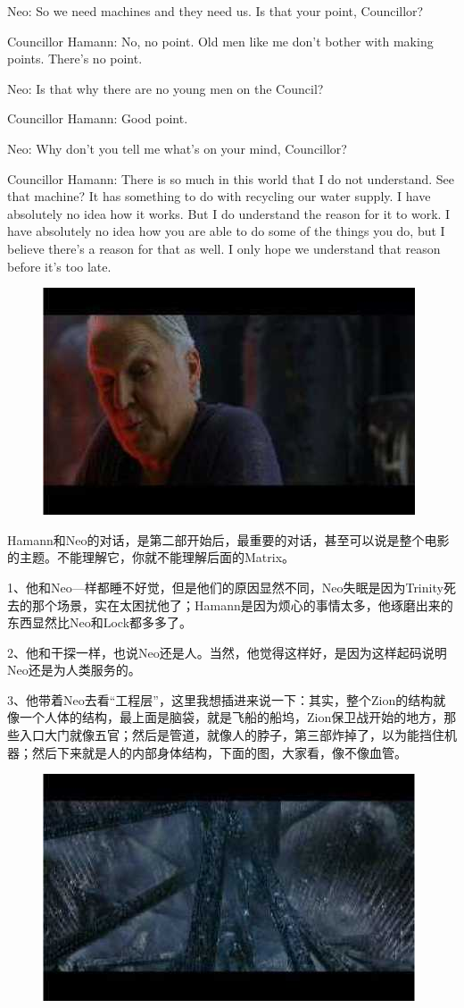 \documentclass{ctexart}
\newenvironment{myquote}{\color{green} \setlength{\leftskip}{6em} \setlength{\rightskip}{4em} \setlength{\parindent}{-2em}}{\par}
\begin{document}
\begin{myquote}
Neo: So we need machines and they need us. Is that your point, Councillor?

Councillor Hamann: No, no point. Old men like me don't bother with making points. There's no point.

Neo: Is that why there are no young men on the Council?

Councillor Hamann: Good point.

Neo: Why don't you tell me what's on your mind, Councillor?

Councillor Hamann: There is so much in this world that I do not understand. See that machine? It has something to do with recycling our water supply. I have absolutely no idea how it works. But I do understand the reason for it to work. I have absolutely no idea how you are able to do some of the things you do, but I believe there's a reason for that as well. I only hope we understand that reason before it's too late.
\end{myquote}

\begin{figure}[htb]
\centering
\includegraphics[width=0.5\linewidth]{fig/read_reloaded-50}
\end{figure}

Hamann和Neo的对话，是第二部开始后，最重要的对话，甚至可以说是整个电影的主题。不能理解它，你就不能理解后面的Matrix。

1、他和Neo—样都睡不好觉，但是他们的原因显然不同，Neo失眠是因为Trinity死去的那个场景，实在太困扰他了；Hamann是因为烦心的事情太多，他琢磨出来的东西显然比Neo和Lock都多多了。

2、他和干探一样，也说Neo还是人。当然，他觉得这样好，是因为这样起码说明Neo还是为人类服务的。

3、他带着Neo去看“工程层”，这里我想插进来说一下：其实，整个Zion的结构就像一个人体的结构，最上面是脑袋，就是飞船的船坞，Zion保卫战开始的地方，那些入口大门就像五官；然后是管道，就像人的脖子，第三部炸掉了，以为能挡住机器；然后下来就是人的内部身体结构，下面的图，大家看，像不像血管。

\begin{figure}[htb]
\centering
\includegraphics[width=0.5\linewidth]{fig/read_reloaded-51}
\end{figure}
\end{document}

